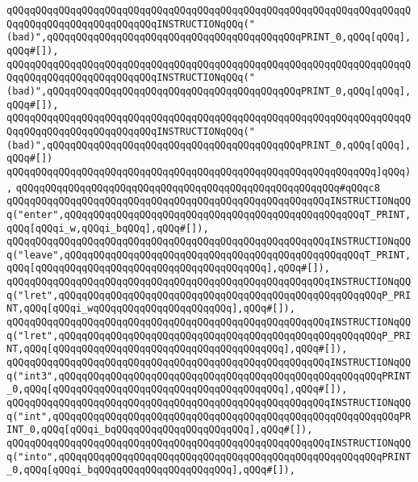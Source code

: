 \verb|qQQqqQQqqQQqqQQqqQQqqQQqqQQqqQQqqQQqqQQqqQQqqQQqqQQqqQQqqQQqqQQqqQQqqQQqqQQqqQQqqQQqqQQqqQQqqQQqINSTRUCTIONqQQq("(bad)",qQQqqQQqqQQqqQQqqQQqqQQqqQQqqQQqqQQqqQQqqQQqPRINT_0,qQQq[qQQq],qQQq#[]),|\newline
\verb|qQQqqQQqqQQqqQQqqQQqqQQqqQQqqQQqqQQqqQQqqQQqqQQqqQQqqQQqqQQqqQQqqQQqqQQqqQQqqQQqqQQqqQQqqQQqqQQqINSTRUCTIONqQQq("(bad)",qQQqqQQqqQQqqQQqqQQqqQQqqQQqqQQqqQQqqQQqqQQqPRINT_0,qQQq[qQQq],qQQq#[]),|\newline
\verb|qQQqqQQqqQQqqQQqqQQqqQQqqQQqqQQqqQQqqQQqqQQqqQQqqQQqqQQqqQQqqQQqqQQqqQQqqQQqqQQqqQQqqQQqqQQqqQQqINSTRUCTIONqQQq("(bad)",qQQqqQQqqQQqqQQqqQQqqQQqqQQqqQQqqQQqqQQqqQQqPRINT_0,qQQq[qQQq],qQQq#[])|\newline
\verb|qQQqqQQqqQQqqQQqqQQqqQQqqQQqqQQqqQQqqQQqqQQqqQQqqQQqqQQqqQQqqQQq]qQQq),|\newline
\verb|qQQqqQQqqQQqqQQqqQQqqQQqqQQqqQQqqQQqqQQqqQQqqQQqqQQqqQQq#qQQqc8|\newline
\verb|qQQqqQQqqQQqqQQqqQQqqQQqqQQqqQQqqQQqqQQqqQQqqQQqqQQqqQQqINSTRUCTIONqQQq("enter",qQQqqQQqqQQqqQQqqQQqqQQqqQQqqQQqqQQqqQQqqQQqqQQqqQQqT_PRINT,qQQq[qQQqi_w,qQQqi_bqQQq],qQQq#[]),|\newline
\verb|qQQqqQQqqQQqqQQqqQQqqQQqqQQqqQQqqQQqqQQqqQQqqQQqqQQqqQQqINSTRUCTIONqQQq("leave",qQQqqQQqqQQqqQQqqQQqqQQqqQQqqQQqqQQqqQQqqQQqqQQqqQQqT_PRINT,qQQq[qQQqqQQqqQQqqQQqqQQqqQQqqQQqqQQqqQQqqQQq],qQQq#[]),|\newline
\verb|qQQqqQQqqQQqqQQqqQQqqQQqqQQqqQQqqQQqqQQqqQQqqQQqqQQqqQQqINSTRUCTIONqQQq("lret",qQQqqQQqqQQqqQQqqQQqqQQqqQQqqQQqqQQqqQQqqQQqqQQqqQQqqQQqP_PRINT,qQQq[qQQqi_wqQQqqQQqqQQqqQQqqQQqqQQq],qQQq#[]),|\newline
\verb|qQQqqQQqqQQqqQQqqQQqqQQqqQQqqQQqqQQqqQQqqQQqqQQqqQQqqQQqINSTRUCTIONqQQq("lret",qQQqqQQqqQQqqQQqqQQqqQQqqQQqqQQqqQQqqQQqqQQqqQQqqQQqqQQqP_PRINT,qQQq[qQQqqQQqqQQqqQQqqQQqqQQqqQQqqQQqqQQqqQQq],qQQq#[]),|\newline
\verb|qQQqqQQqqQQqqQQqqQQqqQQqqQQqqQQqqQQqqQQqqQQqqQQqqQQqqQQqINSTRUCTIONqQQq("int3",qQQqqQQqqQQqqQQqqQQqqQQqqQQqqQQqqQQqqQQqqQQqqQQqqQQqqQQqPRINT_0,qQQq[qQQqqQQqqQQqqQQqqQQqqQQqqQQqqQQqqQQqqQQq],qQQq#[]),|\newline
\verb|qQQqqQQqqQQqqQQqqQQqqQQqqQQqqQQqqQQqqQQqqQQqqQQqqQQqqQQqINSTRUCTIONqQQq("int",qQQqqQQqqQQqqQQqqQQqqQQqqQQqqQQqqQQqqQQqqQQqqQQqqQQqqQQqqQQqPRINT_0,qQQq[qQQqi_bqQQqqQQqqQQqqQQqqQQqqQQq],qQQq#[]),|\newline
\verb|qQQqqQQqqQQqqQQqqQQqqQQqqQQqqQQqqQQqqQQqqQQqqQQqqQQqqQQqINSTRUCTIONqQQq("into",qQQqqQQqqQQqqQQqqQQqqQQqqQQqqQQqqQQqqQQqqQQqqQQqqQQqqQQqPRINT_0,qQQq[qQQqi_bqQQqqQQqqQQqqQQqqQQqqQQq],qQQq#[]),|\newline
